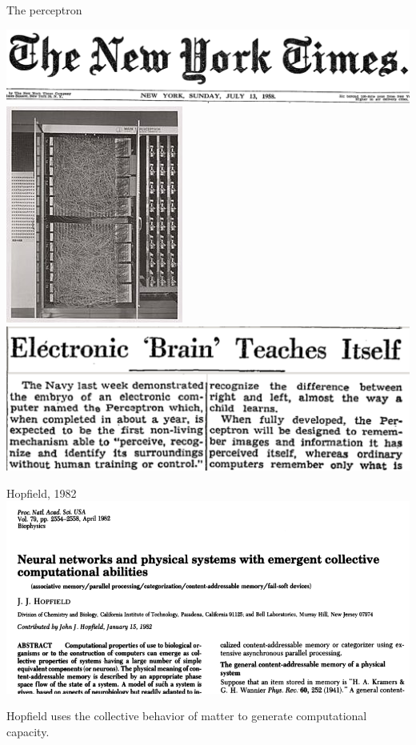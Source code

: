 \documentclass{beamer}
\begin{document}
\begin{frame}{The perceptron}
\begin{center}
\includegraphics[scale=0.25]{pics/NYT_header.png}\\
\includegraphics[scale=0.33]{pics/Mark_I_perceptron.jpg}
\includegraphics[scale=0.23]{pics/NYT1958-07-13.png}
\end{center}
\end{frame}


\begin{frame}{Hopfield, 1982}
\centering\includegraphics[scale=0.4]{pics/Hopfield_paper.png}

Hopfield uses the collective behavior of matter to generate computational capacity.
\end{frame}
\end{document}
